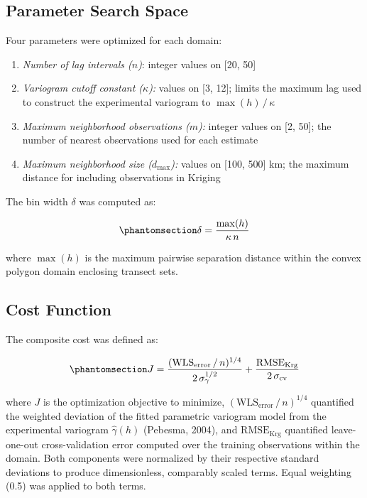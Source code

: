 \documentclass[final]{agujournal2019}
\providecommand{\tightlist}{\setlength{\itemsep}{0pt}\setlength{\parskip}{0pt}}
\begin{document}
\subsection*{Parameter Search Space}\label{sec:parameter-search-space}

Four parameters were optimized for each domain:

\begin{enumerate}
\def\labelenumi{\arabic{enumi}.}
\tightlist
\item
  \emph{Number of lag intervals (\(n\))}: integer values on {[}20, 50{]}
\item
  \emph{Variogram cutoff constant (\(\kappa\)):} values on {[}3, 12{]};
  limits the maximum lag used to construct the experimental variogram to
  \(\max(h)\, /\, \kappa\)
\item
  \emph{Maximum neighborhood observations (\(m\)):} integer values on
  {[}2, 50{]}; the number of nearest observations used for each estimate
\item
  \emph{Maximum neighborhood size (\(d_\mathrm{max}\)):} values on
  {[}100, 500{]} km; the maximum distance for including observations in
  Kriging
\end{enumerate}

The bin width \(\delta\) was computed as:

\begin{equation}\protect\phantomsection\label{eq:bins}{
  \delta = \frac{\max(h)}{\kappa\, n}
}\end{equation}

where \(\max(h)\) is the maximum pairwise separation distance within the
convex polygon domain enclosing transect sets.

\subsection*{Cost Function}\label{sec:cost-function}

The composite cost was defined as:

\begin{equation}\protect\phantomsection\label{eq:cost}{
  J = \frac{(\mathrm{WLS}_\mathrm{error}\, /\, n)^{1/4}}{2\, \sigma_{\gamma}^{1/2}}  + \frac{\mathrm{RMSE}_\mathrm{Krg}}{2\, \sigma_\mathrm{cv}}
}\end{equation}

where \(J\) is the optimization objective to minimize,
\((\mathrm{WLS}_\mathrm{error}\, /\, n)^{1/4}\) quantified the weighted
deviation of the fitted parametric variogram model from the experimental
variogram \(\hat{\gamma}(h)\) (Pebesma, 2004), and
\(\mathrm{RMSE}_\mathrm{Krg}\) quantified leave-one-out cross-validation
error computed over the training observations within the domain. Both
components were normalized by their respective standard deviations to
produce dimensionless, comparably scaled terms. Equal weighting (0.5)
was applied to both terms.
\end{document}
